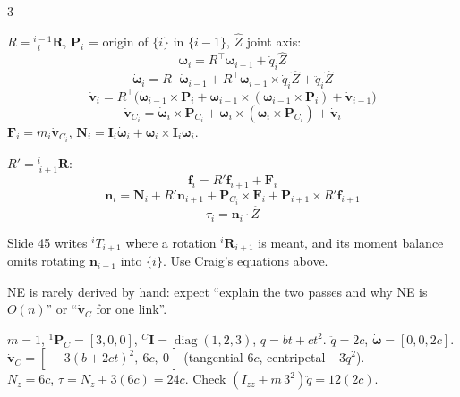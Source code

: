 \begin{multicols}{3}
\begin{fbx}[Outward pass, $i=1\dots n$ (revolute)]
$R={}^{i-1}_{\ \ i}\mathbf R$, $\mathbf P_i$ = origin of $\{i\}$ in $\{i{-}1\}$, $\hat Z$ joint axis:
\[\boldsymbol\omega_i=R^\top\boldsymbol\omega_{i-1}+\dot q_i\hat Z\]
\[\dot{\boldsymbol\omega}_i=R^\top\dot{\boldsymbol\omega}_{i-1}+R^\top\boldsymbol\omega_{i-1}\times\dot q_i\hat Z+\ddot q_i\hat Z\]
\[\dot{\mathbf v}_i=R^\top\big(\dot{\boldsymbol\omega}_{i-1}\times\mathbf P_i+\boldsymbol\omega_{i-1}\times(\boldsymbol\omega_{i-1}\times\mathbf P_i)+\dot{\mathbf v}_{i-1}\big)\]
\[\dot{\mathbf v}_{C_i}=\dot{\boldsymbol\omega}_i\times\mathbf P_{C_i}+\boldsymbol\omega_i\times(\boldsymbol\omega_i\times\mathbf P_{C_i})+\dot{\mathbf v}_i\]
$\mathbf F_i=m_i\dot{\mathbf v}_{C_i}$, $\mathbf N_i=\mathbf I_i\dot{\boldsymbol\omega}_i+\boldsymbol\omega_i\times\mathbf I_i\boldsymbol\omega_i$.
\end{fbx}
\begin{fbx}[Inward pass, $i=n\dots1$, $\mathbf f_{n+1}=\mathbf n_{n+1}=0$]
$R'={}^{i}_{\ i+1}\mathbf R$:
\[\mathbf f_i=R'\mathbf f_{i+1}+\mathbf F_i\]
\[\mathbf n_i=\mathbf N_i+R'\mathbf n_{i+1}+\mathbf P_{C_i}\times\mathbf F_i+\mathbf P_{i+1}\times R'\mathbf f_{i+1}\]
\[\tau_i=\mathbf n_i\cdot\hat Z\]
\end{fbx}
\begin{slideerr}[NE slide 45]
Slide 45 writes ${}^iT_{i+1}$ where a rotation ${}^i\mathbf R_{i+1}$ is meant, and its moment balance omits rotating $\mathbf n_{i+1}$ into $\{i\}$. Use Craig's equations above.
\end{slideerr}
NE is rarely derived by hand: expect ``explain the two passes and why NE is $O(n)$'' or ``$\dot{\mathbf v}_C$ for one link''.

$m=1$, ${}^1\mathbf P_C=[3,0,0]$, ${}^C\mathbf I=\operatorname{diag}(1,2,3)$, $q=bt+ct^2$. $\ddot q=2c$, $\dot{\boldsymbol\omega}=[0,0,2c]$.\\
$\dot{\mathbf v}_C=[\,-3(b{+}2ct)^2,\ 6c,\ 0\,]$ (tangential $6c$, centripetal $-3\dot q^2$).\\
$N_z=6c$, $\tau=N_z+3(6c)=24c$. Check $(I_{zz}{+}m\,3^2)\ddot q=12(2c)$. \chk


\end{multicols}

